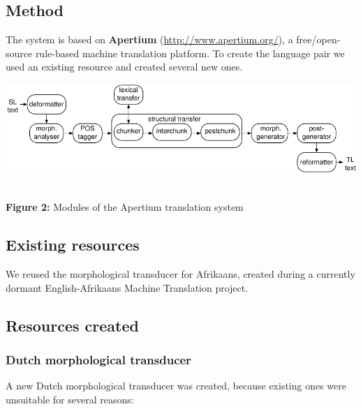 \documentclass[a0,landscape]{a0poster}
\begin{document}
\begin{multicols}{4}
\vspace{0.5cm}

\section{Method}

\noindent
The system is based on {\bf Apertium} (\url{http://www.apertium.org/}), a free/open-source rule-based
machine translation platform. To create the language pair we used an existing resource and created 
several new ones. \\

\begin{center}
\begin{minipage}[b]{26cm}
\includegraphics[width=260mm]{apertium2.pdf}
\end{minipage}\\
\textbf{Figure 2:} Modules of the Apertium translation system
\vspace{0.3cm}
\end{center}


\vspace{0.5cm}

\subsection{Existing resources}

\noindent
We reused the morphological transducer for Afrikaans, created during a currently dormant English-Afrikaans
Machine Translation project.\\

\subsection{Resources created}

\subsubsection{Dutch morphological transducer}
A new Dutch morphological transducer was created, because existing ones were unsuitable for several reasons:


\end{multicols}
\end{document}
